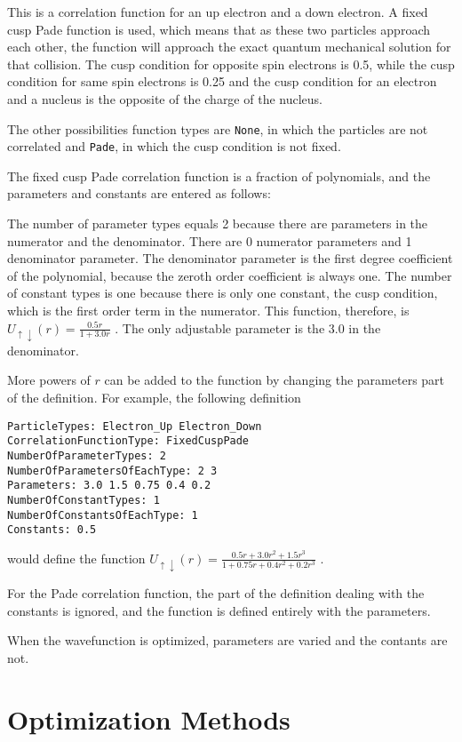 \documentclass[11pt]{article}
\begin{document}
This is a correlation function for an up electron and a down
electron.  A fixed cusp Pade function is used, which means that as
these two particles approach each other, the function will approach
the exact quantum mechanical solution for that collision.  The cusp
condition for opposite spin electrons is 0.5, while the cusp condition
for same spin electrons is 0.25 and the cusp condition for an electron
and a nucleus is the opposite of the charge of the nucleus.

The other possibilities function types are \verb-None-, in which the
particles are not correlated and \verb-Pade-, in which the cusp condition
is not fixed.  

The fixed cusp Pade correlation function is a fraction of polynomials,
and the parameters and constants are entered as follows:

The number of parameter types equals 2 because there are parameters in
the numerator and the denominator.  There are 0 numerator parameters
and 1 denominator parameter.  The denominator parameter is the first
degree coefficient of the polynomial, because the zeroth order
coefficient is always one.  The number of constant types is one
because there is only one constant, the cusp condition, which is the
first order term in the numerator.  This function, therefore, is 
\(
U_{\uparrow \downarrow}(r)=\frac{0.5r}{1+3.0r}
\)
.  The only adjustable parameter is the 3.0 in the denominator. 

More powers of $r$ can be added to the function by changing the
parameters part of the definition.  For example, the following
definition
\begin{verbatim}
ParticleTypes: Electron_Up Electron_Down
CorrelationFunctionType: FixedCuspPade
NumberOfParameterTypes: 2
NumberOfParametersOfEachType: 2 3
Parameters: 3.0 1.5 0.75 0.4 0.2
NumberOfConstantTypes: 1
NumberOfConstantsOfEachType: 1
Constants: 0.5
\end{verbatim}
would define the function 
\(
U_{\uparrow \downarrow}(r)
=\frac{0.5r+3.0r^{2}+1.5r^{3}}{1+0.75r+0.4r^{2}+0.2r^{3}}
\)
.  

For the Pade correlation function, the part of the definition dealing
with the constants is ignored, and the function is defined entirely
with the parameters.

When the wavefunction is optimized, parameters are varied and the
contants are not.  

\section{Optimization Methods}

\renewcommand{\baselinestretch}{1.0} \small


\end{document}
